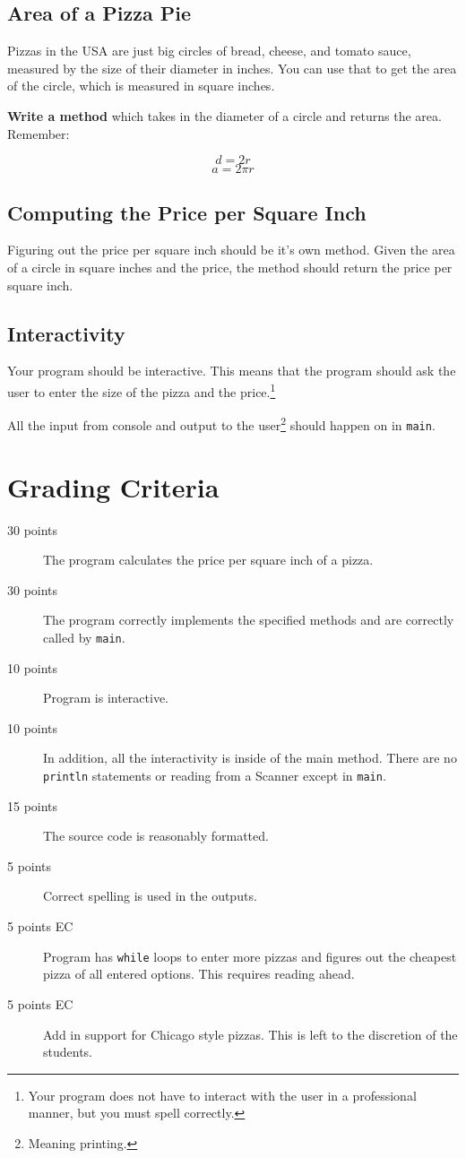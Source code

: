 \documentclass[10pt,letterpaper]{article}
\begin{document}
	\subsection{Area of a Pizza Pie}
	Pizzas in the USA are just big circles of bread, cheese, and tomato sauce, measured by the size of their diameter in inches.
	You can use that to get the area of the circle, which is measured in square inches.
	
	\textbf{Write a method} which takes in the diameter of a circle and returns the area.
	Remember:
	
	\[d =  2r\]
	\[a =  2\pi r\]
	
	
	
	
	\subsection{Computing the Price per Square Inch}
	Figuring out the price per square inch should be it's own method.
	Given the area of a circle in square inches and the price, the method should return the price per square inch.
	
	\subsection{Interactivity}
	Your program should be interactive.  
	This means that the program should ask the user to enter the size of the pizza and the price.\footnote{Your program does not have to interact with the user in a professional manner, but you must spell correctly.}
	
	All the input from console and output to  the user\footnote{Meaning printing.} should happen on in \texttt{main}.
	
	
	
	
	\section{Grading Criteria}
	
	\begin{description}
		\item[30 points] The program calculates the price per square inch of a pizza.  
		\item[30 points] The program correctly implements the specified methods and are correctly called by \texttt{main}.
		\item[10 points] Program is interactive.
		\item[10 points]  In addition, all the interactivity is inside of the main method.  There are no \texttt{println} statements or reading from a Scanner except in \texttt{main}.
		
		\item[15 points] The source code is reasonably formatted.
		\item[5 points] Correct spelling is used in the outputs.
		
		\item[5 points EC] Program has \texttt{while} loops to enter more pizzas and figures out the cheapest pizza of all entered options.  This requires reading ahead.
		\item[5 points EC] Add in support for Chicago style pizzas.  This is left to the discretion of the students.
	\end{description}
\end{document}
